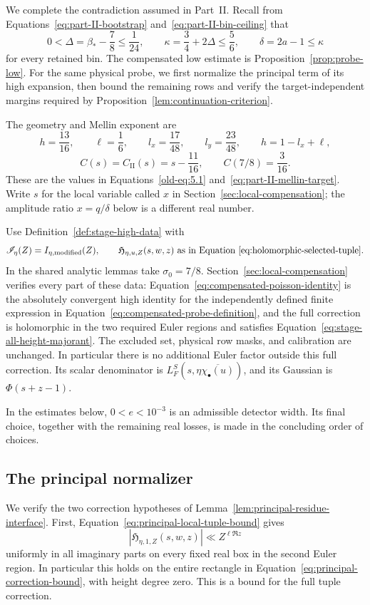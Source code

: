 \documentclass[11pt,a4paper]{article}
\numberwithin{equation}{section}
\numberwithin{figure}{section}
\theoremstyle{definition}
\theoremstyle{remark}
\begin{document}
We complete the contradiction assumed in Part~II.  Recall from
Equations~\eqref{eq:part-II-bootstrap} and~\eqref{eq:part-II-bin-ceiling}
that
\[
 0<\Delta=\beta_*-\frac78\le\frac1{24},\qquad
 \kappa=\frac34+2\Delta\le\frac56,\qquad
 \delta=2a-1\le\kappa
\]
for every retained bin.  The compensated low estimate is
Proposition~\ref{prop:probe-low}. For the same physical probe, we first
normalize the principal term of its high expansion, then bound the remaining
rows and verify the target-independent margins required by
Proposition~\ref{lem:continuation-criterion}.

The geometry and Mellin exponent are
\[
 h=\frac{13}{16},\qquad \ell=\frac16,\qquad
 l_x=\frac{17}{48},\qquad l_y=\frac{23}{48},\qquad
 h=1-l_x+\ell,
\]
\[
 C(s)=C_{\mathrm{II}}(s)=s-\frac{11}{16},
 \qquad C(7/8)=\frac3{16}.
\]
These are the values in Equations~\eqref{old-eq:5.1}
and~\eqref{eq:part-II-mellin-target}.  Write \(s\) for the local variable
called \(x\) in Section~\ref{sec:local-compensation}; the amplitude ratio
\(x=q/\delta\) below is a different real number.

Use Definition~\ref{def:stage-high-data} with
\[
 \mathscr I_\eta(Z)=I_{\eta,\mathrm{modified}}(Z),\qquad
 \mathfrak H_{\eta,u,Z}(s,w,z)
     \ \text{as in Equation~\eqref{eq:holomorphic-selected-tuple}}.
\]
In the shared analytic lemmas take \(\sigma_0=7/8\).
Section~\ref{sec:local-compensation} verifies every part of these data:
Equation~\eqref{eq:compensated-poisson-identity} is the absolutely
convergent high identity for the independently defined finite expression
in Equation~\eqref{eq:compensated-probe-definition}, and the full
correction is holomorphic in the two required Euler regions and satisfies
Equation~\eqref{eq:stage-all-height-majorant}.  The excluded set, physical
row masks, and calibration are unchanged.  In particular there is no
additional Euler factor outside this full correction.  Its scalar
denominator is \(L_F^S(s,\eta\overline{\chi_\bullet(u)})\), and its
Gaussian is \(\Phi(s+z-1)\).

In the estimates below, \(0<e<10^{-3}\) is an admissible detector width.
Its final choice, together with the remaining real losses, is made in
the concluding order of choices.

\subsection{The principal normalizer}\label{sec:principal-signal}

We verify the two correction hypotheses of
Lemma~\ref{lem:principal-residue-interface}.  First,
Equation~\eqref{eq:principal-local-tuple-bound} gives
\[
 |\mathfrak H_{\eta,1,Z}(s,w,z)|\ll Z^{\ell\Re z}
\]
uniformly in all imaginary parts on every fixed real box in the second
Euler region.  In particular this holds on the entire rectangle in
Equation~\eqref{eq:principal-correction-bound}, with height degree zero.
This is a bound for the full tuple correction.
\end{document}
